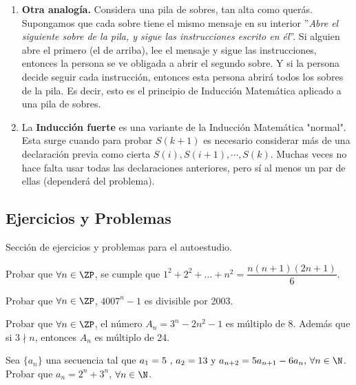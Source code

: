     \begin{enumerate}
        \item { \textbf{Otra analogía.}
        Considera una pila de sobres, tan alta como querás.
        Supongamos que cada sobre tiene el mismo mensaje en su interior ''\textit{Abre el siguiente sobre de la pila, y sigue las instrucciones escrito en él}''.
        Si alguien abre el primero (el de arriba), lee el mensaje y sigue las instrucciones, entonces la persona se ve obligada a abrir el segundo sobre.
        Y si la persona decide seguir cada instrucción, entonces esta persona abrirá todos los sobres de la pila.
        Es decir, esto es el principio de Inducción Matemática aplicado a una pila de sobres.}

        \item La \textbf{Inducción fuerte} es una variante de la Inducción Matemática "normal". Esta surge cuando para probar $S(k + 1)$ es necesario considerar más de una declaración previa como cierta $S(i), S(i + 1), \cdots, S(k)$. Muchas veces no hace falta usar todas las declaraciones anteriores, pero sí al menos un par de ellas (dependerá del problema).
    \end{enumerate}


\subsection{Ejercicios y Problemas}

    Sección de ejercicios y problemas para el autoestudio.

    \begin{section-problem}
        Probar que $\forall n \in \ZP$, se cumple que $1^2 + 2^2 + \dots + n^2 = \dfrac{n(n+1)(2n+1)}{6}$.
    \end{section-problem}

    \begin{section-problem}
        Probar que $\forall n\in \ZP$, $4007^n - 1$ es divisible por 2003.
    \end{section-problem}

    \begin{section-problem}
        Probar que $\forall n \in \ZP$, el número $A_n = 3^n - 2n^2 - 1$ es múltiplo de $8$.
        Además que si $3\nmid n$, entonces $A_n$ es múltiplo de 24.
    \end{section-problem}

    \begin{section-problem}
        Sea $\{a_n\}$ una secuencia tal que $a_1 = 5 \mbox{ , } a_2 = 13 \mbox{ y } a_{n+2}=5a_{n+1}-6a_n \mbox{, } \forall n \in \N$.
        Probar que $a_n = 2^n+3^n$, $\forall n \in \N$.
    \end{section-problem}

